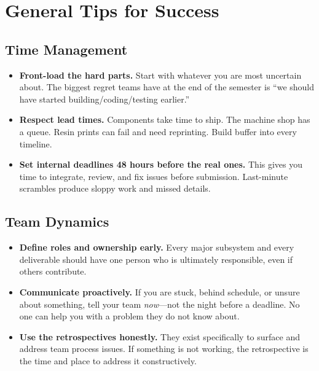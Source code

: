 \documentclass[11pt,letterpaper]{article}
\begin{document}
\section{General Tips for Success}

\subsection{Time Management}

\begin{itemize}[leftmargin=*, itemsep=4pt]
    \item \textbf{Front-load the hard parts.} Start with whatever you are most uncertain about. The biggest regret teams have at the end of the semester is ``we should have started building/coding/testing earlier.''
    \item \textbf{Respect lead times.} Components take time to ship. The machine shop has a queue. Resin prints can fail and need reprinting. Build buffer into every timeline.
    \item \textbf{Set internal deadlines 48 hours before the real ones.} This gives you time to integrate, review, and fix issues before submission. Last-minute scrambles produce sloppy work and missed details.
\end{itemize}

\subsection{Team Dynamics}

\begin{itemize}[leftmargin=*, itemsep=4pt]
    \item \textbf{Define roles and ownership early.} Every major subsystem and every deliverable should have one person who is ultimately responsible, even if others contribute.
    \item \textbf{Communicate proactively.} If you are stuck, behind schedule, or unsure about something, tell your team \textit{now}---not the night before a deadline. No one can help you with a problem they do not know about.
    \item \textbf{Use the retrospectives honestly.} They exist specifically to surface and address team process issues. If something is not working, the retrospective is the time and place to address it constructively.
\end{itemize}
\end{document}

